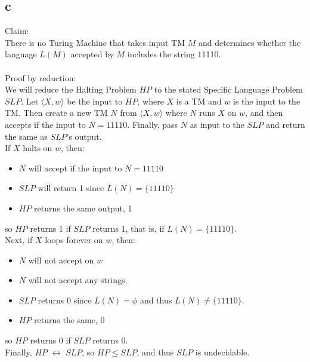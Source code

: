 \documentclass[letterpaper,notitlepage,twoside]{article}
\begin{document}
\subsection*{c}
Claim:\\
There is no Turing Machine that takes input TM $M$ and determines whether the language $L(M)$ accepted by $M$ includes the string 11110.\\\\
Proof by reduction:\\
We will reduce the Halting Problem $HP$ to the stated Specific Language Problem $SLP$. Let $\langle X, w \rangle$ be the input to $HP$, where $X$ is a TM and $w$ is the input to the TM.  Then create a new TM $N$ from $\langle X, w \rangle$ where $N$ runs $X$ on $w$, and then accepts if the input to $N = 11110$. Finally, pass $N$ as input to the $SLP$ and return the same as $SLP$'s output.\\
If $X$ halts on $w$, then:
\begin{itemize}
\item $N$ will accept if the input to $N = 11110$
\item $SLP$ will return 1 since $L(N) = \{11110\}$
\item $HP$ returns the same output, 1
\end{itemize}
so $HP$ returns 1 if $SLP$ returns 1, that is, if $L(N) = \{11110\}$.\\
Next, if $X$ loops forever on $w$, then:
\begin{itemize}
\item $N$ will not accept on $w$
\item $N$ will not accept any strings.
\item $SLP$ returns 0 since $L(N) = \phi$ and thus $L(N) \neq \{11110\}$.
\item $HP$ returns the same, 0
\end{itemize}
so $HP$ returns 0 if $SLP$ returns 0.\\
Finally, $HP$ $\leftrightarrow$ $SLP$, so $HP \le SLP$, and thus $SLP$ is undecidable.
\end{document}
